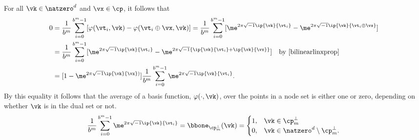 \documentclass[]{elsarticle}
\theoremstyle{definition}
\renewcommand{\bbK}{\natzero^d}
\begin{document}
For all $\vk \in \bbK$ and $\vx \in \cp$, it follows that
\begin{align*}
\nonumber
0 & = \frac{1}{b^m} \sum_{i=0}^{b^m-1} [\varphi(\vt_i,\vk) - \varphi(\vt_i \oplus \vx,\vk)]
= \frac{1}{b^m} \sum_{i=0}^{b^m-1} [\me^{2 \pi \sqrt{-1} \ip{\vk}{\vt_i}} - \me^{2 \pi \sqrt{-1} \ip{\vk}{\vt_i \oplus \vx}}]\\
\nonumber
& = \frac{1}{b^m} \sum_{i=0}^{b^m-1} [\me^{2 \pi \sqrt{-1} \ip{\vk}{\vt_i}} - \me^{2 \pi \sqrt{-1} \{\ip{\vk}{\vt_i}+\ip{\vk}{\vx}\}}] \quad \text{by } \eqref{bilinearlinxprop}\\
\label{sumeq}
& = [1 - \me^{2 \pi \sqrt{-1} \ip{\vk}{\vx})}] \frac{1}{b^m} \sum_{i=0}^{b^m-1}  \me^{2 \pi \sqrt{-1} \ip{\vk}{\vt_i}}.
\end{align*}
By this equality it follows that the average of a basis function, $\varphi(\cdot,\vk)$, over the points in a node set is either one or zero, depending on whether $\vk$ is in the dual set or not.
\begin{equation*}
\frac{1}{b^m} \sum_{i=0}^{b^m-1}  \me^{2 \pi \sqrt{-1} \ip{\vk}{\vt_i}} = \bbone_{\cp_m^{\perp}}(\vk) = \begin{cases} 1 , & \vk \in \cp_m^{\perp}\\
 0,  & \vk \in \bbK \setminus \cp_m^{\perp}.
 \end{cases}
\end{equation*}
\end{document}
